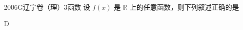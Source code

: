 
\begin{problem}{2006}{G}{辽宁卷（理）}{3}{函数}
设 $ f(x) $ 是 $ \mathbb{R} $ 上的任意函数，则下列叙述正确的是
\begin{choices}
\end{choices}
\end{problem}

\begin{answer}
D
\end{answer}

\begin{solutions}

\end{solutions}